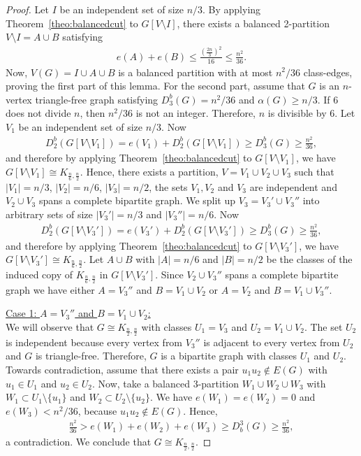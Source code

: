 \documentclass[11pt]{article}
\theoremstyle{definition}
\numberwithin{theo}{section}
\begin{document}
\begin{proof}
Let $I$ be an independent set of size $n/3$. By applying Theorem~\ref{theo:balancedcut} to $G[V\setminus I]$, there exists a balanced 2-partition $V\setminus I=A\cup B$ satisfying
\begin{align*}
     e(A)+e(B)\leq \frac{\left(\frac{2n}{3}\right)^2}{16}\leq \frac{n^2}{36}.
\end{align*}
Now, $V(G)=I\cup A\cup B$ is a balanced partition with at most $n^2/36$ class-edges, proving the first part of this lemma. For the second part, assume that $G$ is an $n$-vertex triangle-free graph satisfying $D_3^b(G)=n^2/36$ and $\alpha(G)\geq n/3$. If 6 does not divide $n$, then $n^2/36$ is not an integer. Therefore, $n$ is divisible by 6. Let $V_1$ be an independent set of size $n/3$. Now 
\begin{align*}
    D_2^b(G[V\setminus V_1])=e(V_1)+ D_2^b(G[V\setminus V_1]) \geq D_3^b(G)\geq \frac{n^2}{36},
\end{align*}
and therefore by applying Theorem~\ref{theo:balancedcut} to $G[V\setminus V_1]$, we have $G[V\setminus V_1]\cong K_{\frac{n}{6},\frac{n}{2}}$. Hence, there exists a partition, $V= V_1 \cup V_2\cup V_3$ such that $|V_1|=n/3$, $|V_2|=n/6$, $|V_3|=n/2$, the sets $V_1,V_2$ and $V_3$ are independent and $V_2\cup V_3$ spans a complete bipartite graph. We split up $V_3=V_3' \cup V_3''$ into arbitrary sets of size $|V_3'|=n/3$ and $|V_3''|=n/6$. Now 
\begin{align*}
    D_2^b(G[V\setminus V_3'])=e(V_3')+ D_2^b(G[V\setminus V_3']) \geq D_3^b(G)\geq \frac{n^2}{36},
\end{align*}
and therefore by applying Theorem~\ref{theo:balancedcut} to $G[V\setminus V_3']$, we have $G[V\setminus V_3']\cong K_{\frac{n}{6},\frac{n}{2}}$. Let $A\cup B$ with $|A|=n/6$ and $|B|=n/2$ be the classes of the induced copy of $K_{\frac{n}{6},\frac{n}{2}}$ in $G[V\setminus V_3']$.  Since $V_2\cup V_3''$ spans a complete bipartite graph we have either $A=V_3''$ and $B=V_1\cup V_2$ or $A=V_2$ and $B=V_1\cup V_3''$.

\underline{Case 1: $A=V_3''$ and $B=V_1\cup V_2$:}\\
We will observe that $G\cong K_{\frac{n}{2},\frac{n}{2}}$ with classes $U_1=V_3$ and $U_2=V_1\cup V_2$. The set $U_2$ is independent because every vertex from $V_3''$ is adjacent to every vertex from $U_2$ and $G$ is triangle-free. Therefore, $G$ is a bipartite graph with classes $U_1$ and $U_2$. Towards contradiction, assume that there exists a pair $u_1u_2\notin E(G)$ with $u_1\in U_1$ and $u_2\in U_2$. Now, take a balanced 3-partition $W_1\cup W_2 \cup W_3$ with $W_1\subset U_1\setminus \{u_1\}$ and $W_2\subset U_2\setminus \{u_2\}$. We have $e(W_1)=e(W_2)=0$ and $e(W_3)<n^2/36$, because $u_1u_2\notin E(G)$. Hence,
\begin{align*}
    \frac{n^2}{36}> e(W_1)+e(W_2)+e(W_3)\geq D_b^3(G)\geq \frac{n^2}{36},
\end{align*}
a contradiction. We conclude that $G\cong K_{\frac{n}{2},\frac{n}{2}}$. 


\end{proof}
\end{document}
